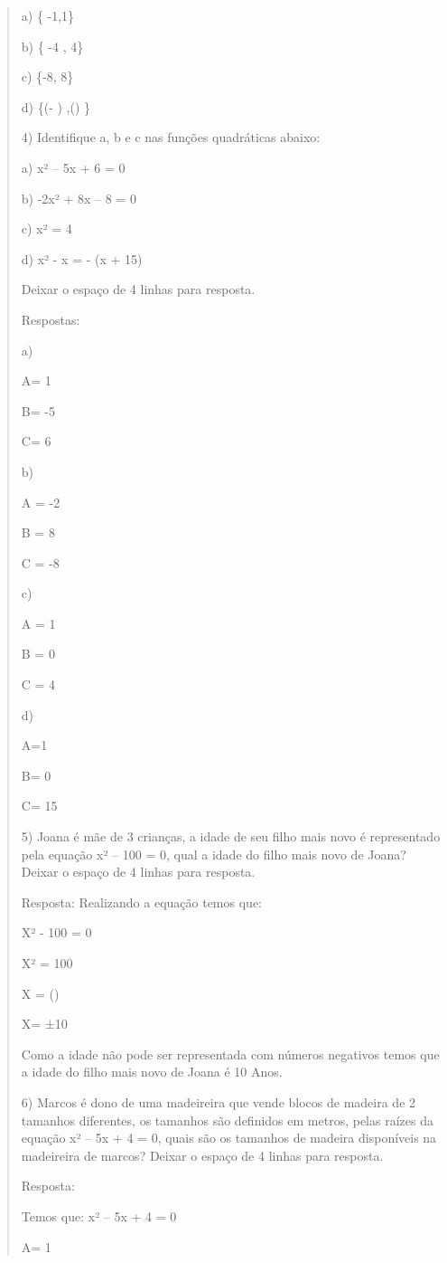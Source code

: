 \begin{quote}
\begin{escolha}
a) \{ -1,1\}

b) \{ -4 , 4\}

c) \{-8, 8\}

d) \{(- ) ,() \}

4) Identifique a, b e c nas funções quadráticas abaixo:

a) x² -- 5x + 6 = 0

b) -2x² + 8x -- 8 = 0

c) x² = 4

d) x² - x = - (x + 15)

Deixar o espaço de 4 linhas para resposta.

Respostas:

a)

A= 1

B= -5

C= 6

b)

A = -2

B = 8

C = -8

c)

A = 1

B = 0

C = 4

d)

A=1

B= 0

C= 15

5) Joana é mãe de 3 crianças, a idade de seu filho mais novo é
representado pela equação x² -- 100 = 0, qual a idade do filho mais novo
de Joana? Deixar o espaço de 4 linhas para resposta.

Resposta: Realizando a equação temos que:

X² - 100 = 0

X² = 100

X = ()

X= ±10

Como a idade não pode ser representada com números negativos temos que a
idade do filho mais novo de Joana é 10 Anos.

6) Marcos é dono de uma madeireira que vende blocos de madeira de 2
tamanhos diferentes, os tamanhos são definidos em metros, pelas raízes
da equação x² -- 5x + 4 = 0, quais são os tamanhos de madeira
disponíveis na madeireira de marcos? Deixar o espaço de 4 linhas para
resposta.

Resposta:

Temos que: x² -- 5x + 4 = 0

A= 1


\end{escolha}
\end{quote}
